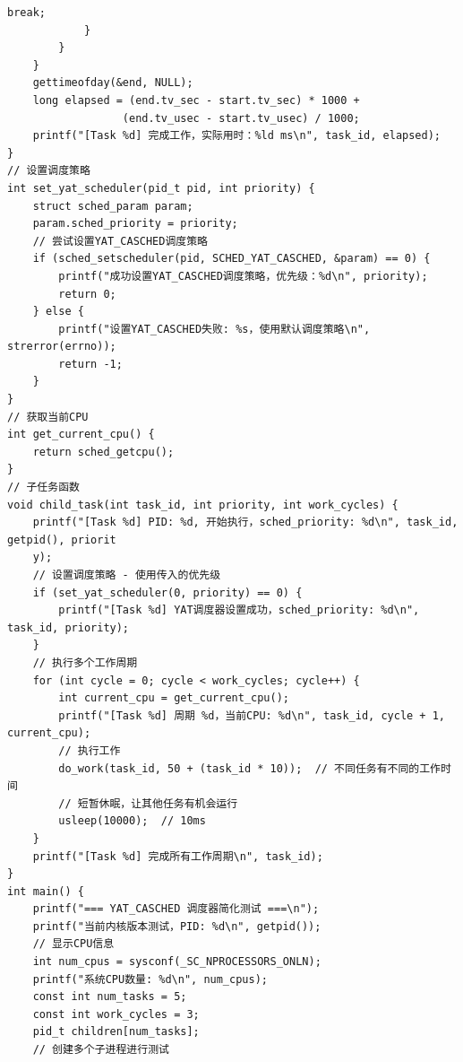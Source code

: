 \documentclass[10pt,a4paper]{article}
\newenvironment{yatpage}{\vspace*{0pt}}{\par}
\begin{document}
\begin{yatpage}
\begin{Verbatim}[fontsize=\fontsize{8.2}{9.8}\selectfont]
                break;
            }
        }
    }
    gettimeofday(&end, NULL);
    long elapsed = (end.tv_sec - start.tv_sec) * 1000 +
                  (end.tv_usec - start.tv_usec) / 1000;
    printf("[Task %d] 完成工作，实际用时：%ld ms\n", task_id, elapsed);
}
// 设置调度策略
int set_yat_scheduler(pid_t pid, int priority) {
    struct sched_param param;
    param.sched_priority = priority;
    // 尝试设置YAT_CASCHED调度策略
    if (sched_setscheduler(pid, SCHED_YAT_CASCHED, &param) == 0) {
        printf("成功设置YAT_CASCHED调度策略，优先级：%d\n", priority);
        return 0;
    } else {
        printf("设置YAT_CASCHED失败: %s，使用默认调度策略\n", strerror(errno));
        return -1;
    }
}
// 获取当前CPU
int get_current_cpu() {
    return sched_getcpu();
}
// 子任务函数
void child_task(int task_id, int priority, int work_cycles) {
    printf("[Task %d] PID: %d, 开始执行，sched_priority: %d\n", task_id, getpid(), priorit
    y);
    // 设置调度策略 - 使用传入的优先级
    if (set_yat_scheduler(0, priority) == 0) {
        printf("[Task %d] YAT调度器设置成功，sched_priority: %d\n", task_id, priority);
    }
    // 执行多个工作周期
    for (int cycle = 0; cycle < work_cycles; cycle++) {
        int current_cpu = get_current_cpu();
        printf("[Task %d] 周期 %d，当前CPU: %d\n", task_id, cycle + 1, current_cpu);
        // 执行工作
        do_work(task_id, 50 + (task_id * 10));  // 不同任务有不同的工作时间
        // 短暂休眠，让其他任务有机会运行
        usleep(10000);  // 10ms
    }
    printf("[Task %d] 完成所有工作周期\n", task_id);
}
int main() {
    printf("=== YAT_CASCHED 调度器简化测试 ===\n");
    printf("当前内核版本测试，PID: %d\n", getpid());
    // 显示CPU信息
    int num_cpus = sysconf(_SC_NPROCESSORS_ONLN);
    printf("系统CPU数量: %d\n", num_cpus);
    const int num_tasks = 5;
    const int work_cycles = 3;
    pid_t children[num_tasks];
    // 创建多个子进程进行测试
\end{Verbatim}
\end{yatpage}
\newpage
\end{document}
